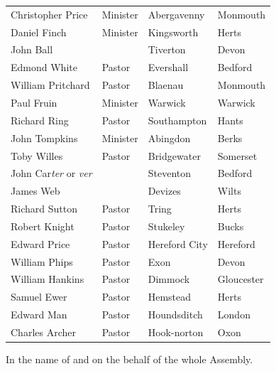 \documentclass[
    paper=letterpaper,
    11pt,
    twoside,
    DIV=calc,
    openany
]{scrbook}
\begin{document}
\begin{table}[H]
\begin{tabular}{llll}
Christopher Price                    & Minister & Abergavenny                 & Monmouth       \\
Daniel Finch                         & Minister & Kingsworth                  & Herts          \\
John Ball                            &          & Tiverton                    & Devon          \\
Edmond White                         & Pastor   & Evershall                   & Bedford        \\
William Pritchard                    & Pastor   & Blaenau                     & Monmouth       \\
Paul Fruin                           & Minister & Warwick                     & Warwick        \\
Richard Ring                         & Pastor   & Southampton                 & Hants          \\
John Tompkins                        & Minister & Abingdon                    & Berks          \\
Toby Willes                          & Pastor   & Bridgewater                 & Somerset       \\
John Car\textit{ter} or \textit{ver} &          & Steventon                   & Bedford        \\
James Web                            &          & Devizes                     & Wilts          \\
Richard Sutton                       & Pastor   & Tring                       & Herts          \\
Robert Knight                        & Pastor   & Stukeley                    & Bucks          \\
Edward Price                         & Pastor   & Hereford City               & Hereford       \\
William Phips                        & Pastor   & Exon                        & Devon          \\
William Hankins                      & Pastor   & Dimmock                     & Gloucester     \\
Samuel Ewer                          & Pastor   & Hemstead                    & Herts          \\
Edward Man                           & Pastor   & Houndsditch                 & London         \\
Charles Archer                       & Pastor   & Hook-norton                 & Oxon           \\
\end{tabular}
\end{table}

In the name of and on the behalf of the whole Assembly.
\end{document}

